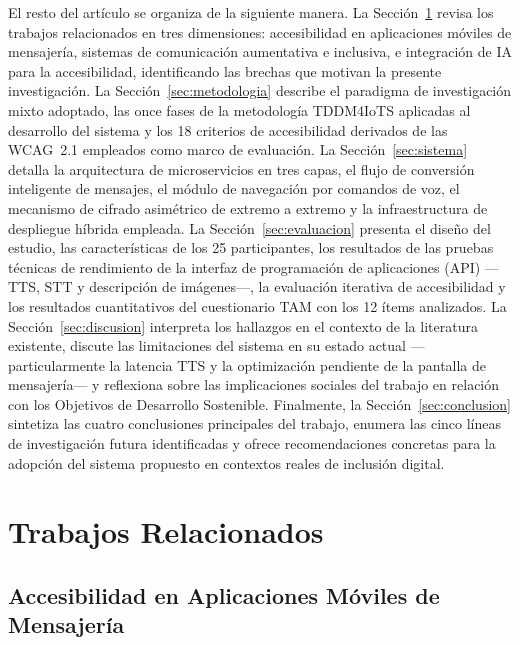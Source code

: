 \documentclass[journal]{IEEEtran}
\begin{document}
El resto del art\'iculo se organiza de la siguiente manera. La Secci\'on~\ref{sec:relacionados} revisa los trabajos relacionados en tres dimensiones: accesibilidad en aplicaciones m\'oviles de mensajer\'ia, sistemas de comunicaci\'on aumentativa e inclusiva, e integraci\'on de IA para la accesibilidad, identificando las brechas que motivan la presente investigaci\'on. La Secci\'on~\ref{sec:metodologia} describe el paradigma de investigaci\'on mixto adoptado, las once fases de la metodolog\'ia TDDM4IoTS aplicadas al desarrollo del sistema y los 18 criterios de accesibilidad derivados de las WCAG~2.1 empleados como marco de evaluaci\'on. La Secci\'on~\ref{sec:sistema} detalla la arquitectura de microservicios en tres capas, el flujo de conversi\'on inteligente de mensajes, el m\'odulo de navegaci\'on por comandos de voz, el mecanismo de cifrado asim\'etrico de extremo a extremo y la infraestructura de despliegue h\'ibrida empleada. La Secci\'on~\ref{sec:evaluacion} presenta el dise\~no del estudio, las caracter\'isticas de los 25 participantes, los resultados de las pruebas t\'ecnicas de rendimiento de la interfaz de programaci\'on de aplicaciones (API) ---TTS, STT y descripci\'on de im\'agenes---, la evaluaci\'on iterativa de accesibilidad y los resultados cuantitativos del cuestionario TAM con los 12 \'items analizados. La Secci\'on~\ref{sec:discusion} interpreta los hallazgos en el contexto de la literatura existente, discute las limitaciones del sistema en su estado actual ---particularmente la latencia TTS y la optimizaci\'on pendiente de la pantalla de mensajer\'ia--- y reflexiona sobre las implicaciones sociales del trabajo en relaci\'on con los Objetivos de Desarrollo Sostenible. Finalmente, la Secci\'on~\ref{sec:conclusion} sintetiza las cuatro conclusiones principales del trabajo, enumera las cinco l\'ineas de investigaci\'on futura identificadas y ofrece recomendaciones concretas para la adopci\'on del sistema propuesto en contextos reales de inclusi\'on digital.

\section{Trabajos Relacionados}
\label{sec:relacionados}

\subsection{Accesibilidad en Aplicaciones M\'oviles de Mensajer\'ia}
\end{document}
